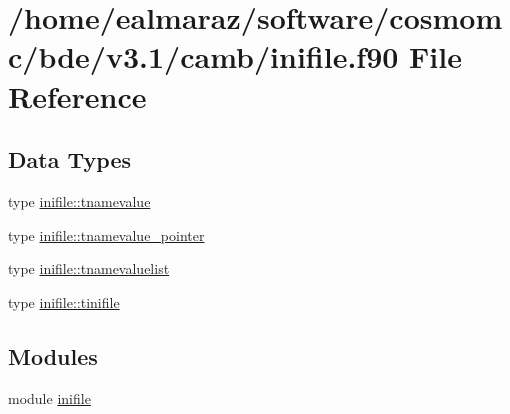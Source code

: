 \hypertarget{inifile_8f90}{}\section{/home/ealmaraz/software/cosmomc/bde/v3.1/camb/inifile.f90 File Reference}
\label{inifile_8f90}
\subsection*{Data Types}
\begin{DoxyCompactItemize}
\item 
type \mbox{\hyperlink{structinifile_1_1tnamevalue}{inifile\+::tnamevalue}}
\item 
type \mbox{\hyperlink{structinifile_1_1tnamevalue__pointer}{inifile\+::tnamevalue\+\_\+pointer}}
\item 
type \mbox{\hyperlink{structinifile_1_1tnamevaluelist}{inifile\+::tnamevaluelist}}
\item 
type \mbox{\hyperlink{structinifile_1_1tinifile}{inifile\+::tinifile}}
\end{DoxyCompactItemize}
\subsection*{Modules}
\begin{DoxyCompactItemize}
\item 
module \mbox{\hyperlink{namespaceinifile}{inifile}}
\end{DoxyCompactItemize}
